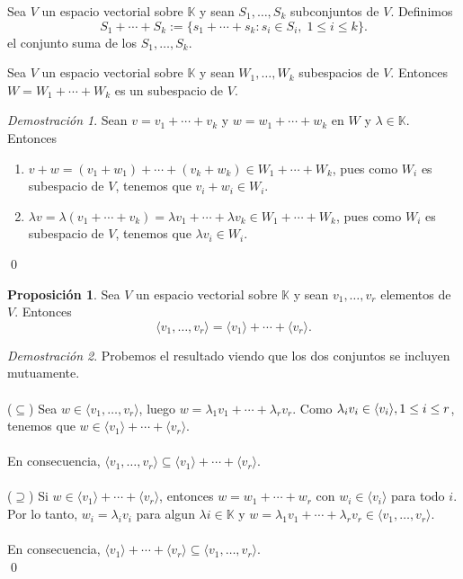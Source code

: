 \documentclass{article}
\theoremstyle{definition}
\theoremstyle{definition}
\newtheorem{prop}[teo]{Proposición}
\theoremstyle{remark}
\newtheorem*{demo}{Demostración}
\begin{document}
\begin{defi}
  Sea $V$ un espacio vectorial sobre $\mathbb{K}$ y sean $S_1, \dots ,S_k$ subconjuntos de $V$. Definimos \[
    S_1 + \cdots + S_k := \{s_1+\cdots + s_k : s_i \in S_i , \; 1 \leq i \leq k\}.
  \]
  el conjunto suma de los $S_1, \dots , S_k$.
\end{defi}
\begin{teo}
  Sea $V$ un espacio vectorial sobre $\mathbb{K}$ y sean $W_1, \dots ,W_k$ subespacios de $V$. Entonces $W=W_1+\cdots + W_k$ es un subespacio de $V$.
\end{teo}\begin{demo}
Sean $v=v_1+\cdots + v_k$ y $w = w_1 + \cdots + w_k$ en $W$ y $\lambda \in \mathbb{K}$. Entonces \begin{enumerate}[label=(\alph*)] 
  \item $v+w=(v_1+w_1)+\cdots + (v_k+w_k) \in W_1+\cdots + W_k$, pues como $W_i$ es subespacio de $V$, tenemos que $v_i+w_i \in W_i$. 
  \item $\lambda v = \lambda (v_1+\cdots + v_k) = \lambda v_1 + \cdots + \lambda v_k \in W_1+\cdots + W_k$, pues como $W_i$ es subespacio de $V$, tenemos que $\lambda v_i \in W_i$. 
\end{enumerate}
\qed
\end{demo}
\begin{prop}
  Sea $V$ un espacio vectorial sobre $\mathbb{K}$ y sean $v_1, \dots ,v_r$ elementos de $V$. Entonces \[
\langle v_1, \dots ,v_r \rangle = \langle v_1 \rangle + \cdots + \langle v_r \rangle .
  \]
\end{prop}
\begin{demo}
  Probemos el resultado viendo que los dos conjuntos se incluyen mutuamente. \\\\
  ($\subseteq$) Sea $w \in \langle v_1, \dots ,v_r \rangle$, luego $w=\lambda_1 v_1 + \cdots + \lambda_r v_r$. Como $\lambda_i v_i \in \langle v_i \rangle, \\ 1\leq i \leq r$, tenemos que $w \in \langle v_1 \rangle + \cdots + \langle v_r \rangle $. \\\\ En consecuencia, $\langle v_1, \dots, v_r \rangle  \subseteq \langle v_1 \rangle + \cdots + \langle v_r \rangle $. \\\\
  ($\supseteq$) Si $w \in \langle v_1 \rangle + \cdots + \langle v_r \rangle$, entonces $w=w_1 + \cdots + w_r$ con $w_i \in \langle v_i \rangle $ para todo $i$. Por lo tanto, $w_i = \lambda_i v_i$ para algun $\lambda i \in \mathbb{K}$ y $w=\lambda_1 v_1 + \cdots + \lambda_r v_r \in \langle v_1, \dots ,v_r \rangle.$ \\\\ En consecuencia, $\langle v_1 \rangle + \cdots + \langle v_r \rangle \subseteq \langle v_1, \dots ,v_r \rangle$. \\
\qed
\end{demo} \pagebreak
\end{document}
